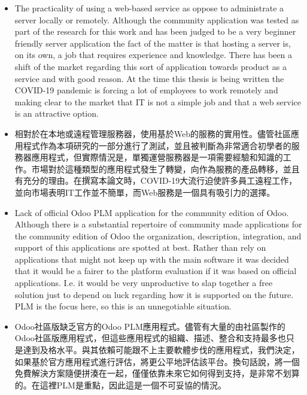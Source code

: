 \begin{itemize}
\item The practicality of using a web-based service as oppose to administrate a server locally or remotely. Although the community application was tested as part of the research for this work and has been judged to be a very beginner friendly server application the fact of the matter is that hosting a server is, on its own, a job that requires experience and knowledge. There has been a shift of the market regarding this sort of application towards product as a service and with good reason. At the time this thesis is being written the COVID-19 pandemic is forcing a lot of employees to work remotely and making clear to the market that IT is not a simple job and that a web service is an attractive option.
\item 相對於在本地或遠程管理服務器，使用基於Web的服務的實用性。儘管社區應用程式作為本項研究的一部分進行了測試，並且被判斷為非常適合初學者的服務器應用程式，但實際情況是，單獨運營服務器是一項需要經驗和知識的工作。市場對於這種類型的應用程式發生了轉變，向作為服務的產品轉移，並且有充分的理由。在撰寫本論文時，COVID-19大流行迫使許多員工遠程工作，並向市場表明IT工作並不簡單，而Web服務是一個具有吸引力的選擇。
\vspace{1cm}
\item Lack of official Odoo PLM application for the community edition of Odoo. Although there is a substantial repertoire of community made applications for the community edition of Odoo the organization, description, integration, and support of this applications are spotted at best. Rather than rely on applications that might not keep up with the main software it was decided that it would be a fairer to the platform evaluation if it was based on official applications. I.e. it would be very unproductive to slap together a free solution just to depend on luck regarding how it is supported on the future. PLM is the focus here, so this is an unnegotiable situation.
\item Odoo社區版缺乏官方的Odoo PLM應用程式。儘管有大量的由社區製作的Odoo社區版應用程式，但這些應用程式的組織、描述、整合和支持最多也只是達到及格水平。與其依賴可能跟不上主要軟體步伐的應用程式，我們決定，如果基於官方應用程式進行評估，將更公平地評估該平台。換句話說，將一個免費解決方案隨便拼湊在一起，僅僅依靠未來它如何得到支持，是非常不划算的。在這裡PLM是重點，因此這是一個不可妥協的情況。
\end{itemize}

